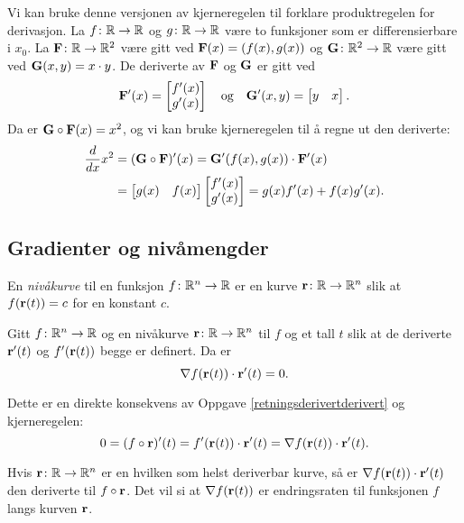 \begin{eksempel}
  Vi kan bruke denne versjonen av kjerneregelen til forklare produktregelen for
  derivasjon.
  La $f \colon \mathbb{R} \to \mathbb{R}$ og $g \colon \mathbb{R} \to \mathbb{R}$ være to funksjoner som er
  differensierbare i $x_0$.
  La $\mathbf{F} \colon \mathbb{R} \to \mathbb{R}^2$ være gitt ved $\mathbf{F}(x) = (f(x), g(x))$ og $\mathbf{G} \colon
  \mathbb{R}^2 \to \mathbb{R}$ være gitt ved $\mathbf{G}(x, y) = x \cdot y$.
  De deriverte av $\mathbf{F}$ og $\mathbf{G}$ er gitt ved
  $$\mathbf{F}'(x) = \begin{bmatrix} f'(x) \\ g'(x) \end{bmatrix} \quad \text{og} \quad \mathbf{G}'(x, y)
  = \begin{bmatrix} y & x \end{bmatrix}.$$
  Da er $\mathbf{G} \circ \mathbf{F}(x) = x^2$,
  og vi kan bruke kjerneregelen til å regne ut den deriverte:
  \begin{align*}
    \frac{d}{dx} x^2 &= (\mathbf{G} \circ \mathbf{F})'(x) = \mathbf{G}'(f(x), g(x)) \cdot \mathbf{F}'(x) \\
    &= \begin{bmatrix} g(x) & f(x) \end{bmatrix} \begin{bmatrix} f'(x) \\ g'(x)
  \end{bmatrix} = g(x) f'(x) + f(x) g'(x).
    \end{align*}
\end{eksempel}
\subsection{Gradienter og nivåmengder}

\begin{definisjon}
  En {\em nivåkurve} til en funksjon $f \colon \mathbb{R}^n \to \mathbb{R}$ er en kurve
  $\mathbf{r} \colon \mathbb{R} \to \mathbb{R}^n$
  slik at $f(\mathbf{r}(t)) = c$ for en konstant $c$.
\end{definisjon}
\begin{teorem}
  Gitt $f \colon \mathbb{R}^n \to \mathbb{R}$ og en nivåkurve $\mathbf{r} \colon \mathbb{R} \to \mathbb{R}^n$
  til $f$ og et tall $t$ slik at de deriverte  $\mathbf{r}'(t)$ og $f'(\mathbf{r}(t))$
  begge er definert. Da er 
  $$\nabla f(\mathbf{r}(t)) \cdot \mathbf{r}'(t) = 0.$$
\end{teorem}
Dette er en direkte konsekvens av Oppgave \ref{retningsderivertderivert} og kjerneregelen:
\begin{displaymath}
  0 = (f \circ \mathbf{r})'(t) =
  f'(\mathbf{r}(t)) \cdot \mathbf{r}'(t) =
  \nabla f(\mathbf{r}(t)) \cdot \mathbf{r}'(t).
\end{displaymath}

Hvis $\mathbf{r} \colon \mathbb{R} \to \mathbb{R}^n$ er en hvilken som helst deriverbar kurve, så er $\nabla f(\mathbf{r}(t)) \cdot \mathbf{r}'(t)$ den deriverte til $f \circ \mathbf{r}$. Det vil si at $\nabla f(\mathbf{r}(t))$ er endringsraten til funksjonen $f$ langs kurven $\mathbf{r}$.
